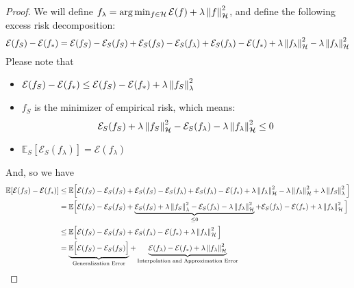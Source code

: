 \begin{proof}
    We will define $f_\lambda = \arg\min_{f\in\mathcal{H}}\mathcal{E}(f) + \lambda\left\lVert f\right\rVert^2_\mathcal{H}$, and define the following excess risk decomposition:
    \begin{equation*}
        \mathcal{E}(f_S) - \mathcal{E}(f_*) = \mathcal{E}(f_S) - \mathcal{E}_S(f_S) + \mathcal{E}_S(f_S) - \mathcal{E}_S(f_\lambda) + \mathcal{E}_S(f_\lambda) - \mathcal{E}(f_*) +\lambda\left\lVert f_\lambda\right\rVert^2_\mathcal{H} -\lambda\left\lVert f_\lambda\right\rVert^2_\mathcal{H}
    \end{equation*}
    Please note that 
    \begin{itemize}
        \item $\mathcal{E}(f_S) - \mathcal{E}(f_*) \le \mathcal{E}(f_S) - \mathcal{E}(f_*) + \lambda\left\lVert f_S\right\rVert^2_\lambda$
        \item $f_S$ is the minimizer of empirical risk, which means:
        \begin{equation*}
            \mathcal{E}_S(f_S) +\lambda\left\lVert f_S\right\rVert^2_\mathcal{H} - \mathcal{E}_S(f_\lambda) - \lambda\left\lVert f_\lambda\right\rVert^2_\mathcal{H} \le 0
        \end{equation*}
        \item $\mathbb{E}_S[\mathcal{E}_S(f_\lambda)] = \mathcal{E}(f_\lambda)$
    \end{itemize}
    And, so we have 
    \begin{equation*}
    \begin{aligned}
        \mathbb{E}[\mathcal{E}(f_S) - \mathcal{E}(f_*)] &\le \mathbb{E}\Big[\mathcal{E}(f_S) - \mathcal{E}_S(f_S) + \mathcal{E}_S(f_S) - \mathcal{E}_S(f_\lambda) + \mathcal{E}_S(f_\lambda) - \mathcal{E}(f_*) +\lambda\norm{f_\lambda}^2_\mathcal{H} -\lambda\norm{f_\lambda}^2_\mathcal{H} + \lambda\norm{f_S}^2_\lambda\Big] \\
        &= \mathbb{E}\Big[\mathcal{E}(f_S) - \mathcal{E}_S(f_S) + \underbrace{\mathcal{E}_S(f_S) + \lambda\norm{f_S}^2_\lambda - \mathcal{E}_S(f_\lambda) -\lambda\norm{f_\lambda}^2_\mathcal{H}}_{\le0} + \mathcal{E}_S(f_\lambda) - \mathcal{E}(f_*) +\lambda\norm{f_\lambda}^2_\mathcal{H}\Big] \\
        &\le \mathbb{E}\Big[\mathcal{E}(f_S) - \mathcal{E}_S(f_S) +   \mathcal{E}_S(f_\lambda) - \mathcal{E}(f_*) +\lambda\norm{f_\lambda}^2_\mathcal{H} \Big] \\
        &= \underbrace{\mathbb{E}\Big[\mathcal{E}(f_S) - \mathcal{E}_S(f_S) \Big]}_{\text{Generalization Error}} + \underbrace{\mathcal{E}(f_\lambda) - \mathcal{E}(f_*) +\lambda\norm{f_\lambda}^2_\mathcal{H} }_\text{Interpolation and Approximation Error}\\

\end{aligned}
\end{equation*}
\end{proof}
